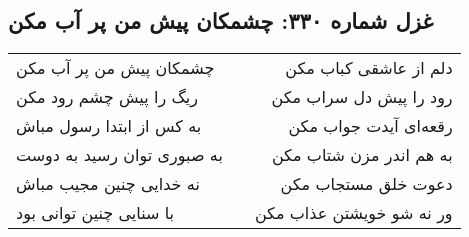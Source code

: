 \begin{center}
\section*{غزل شماره ۳۳۰: چشمکان پیش من پر آب مکن}
\label{sec:330}
\begin{longtable}{l p{0.5cm} r}
چشمکان پیش من پر آب مکن
&&
دلم از عاشقی کباب مکن
\\
ریگ را پیش چشم رود مکن
&&
رود را پیش دل سراب مکن
\\
به کس از ابتدا رسول مباش
&&
رقعه‌ای آیدت جواب مکن
\\
به صبوری توان رسید به دوست
&&
به هم اندر مزن شتاب مکن
\\
نه خدایی چنین مجیب مباش
&&
دعوت خلق مستجاب مکن
\\
با سنایی چنین توانی بود
&&
ور نه شو خویشتن عذاب مکن
\\
\end{longtable}
\end{center}
